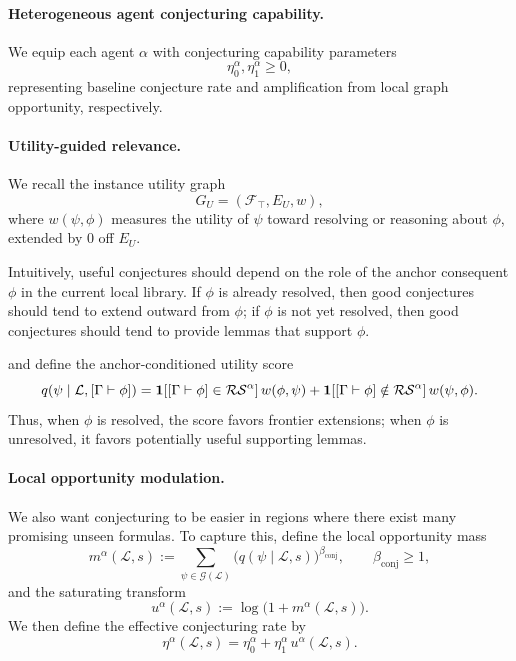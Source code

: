 \paragraph{Heterogeneous agent conjecturing capability.}
We equip each agent $\alpha$ with conjecturing capability parameters
\[
\eta_0^\alpha,\eta_1^\alpha\ge 0,
\]
representing baseline conjecture rate and amplification from local graph opportunity, respectively.

\paragraph{Utility-guided relevance.}
We recall the instance utility graph
\[
G_U=(\mathcal F_\top,E_U,w),
\]
where $w(\psi,\phi)$ measures the utility of $\psi$ toward resolving or reasoning about $\phi$, extended by $0$ off $E_U$.

Intuitively, useful conjectures should depend on the role of the anchor consequent $\phi$ in the current local library. If $\phi$ is already resolved, then good conjectures should tend to extend outward from $\phi$; if $\phi$ is not yet resolved, then good conjectures should tend to provide lemmas that support $\phi$.

and define the anchor-conditioned utility score
\[
q(\psi\mid \mathcal L,[\Gamma\vdash\phi])
=
\mathbf 1[[\Gamma\vdash\phi]\in\mathcal {RS}^\alpha]\,w(\phi,\psi)
+
\mathbf 1[[\Gamma\vdash\phi]\notin\mathcal {RS}^\alpha]\,w(\psi,\phi).
\]
Thus, when $\phi$ is resolved, the score favors frontier extensions; when $\phi$ is unresolved, it favors potentially useful supporting lemmas.

\paragraph{Local opportunity modulation.}
We also want conjecturing to be easier in regions where there exist many promising unseen formulas. To capture this, define the local opportunity mass
\[
m^\alpha(\mathcal L,s)
:=
\sum_{\psi\in\mathcal G(\mathcal L)} \big(q(\psi\mid \mathcal L,s)\big)^{\beta_{\mathrm{conj}}},
\qquad
\beta_{\mathrm{conj}}\ge 1,
\]
and the saturating transform
\[
u^\alpha(\mathcal L,s):=\log\big(1+m^\alpha(\mathcal L,s)\big).
\]
We then define the effective conjecturing rate by
\[
\eta^\alpha(\mathcal L,s)
=
\eta_0^\alpha+\eta_1^\alpha\,u^\alpha(\mathcal L,s).
\]

